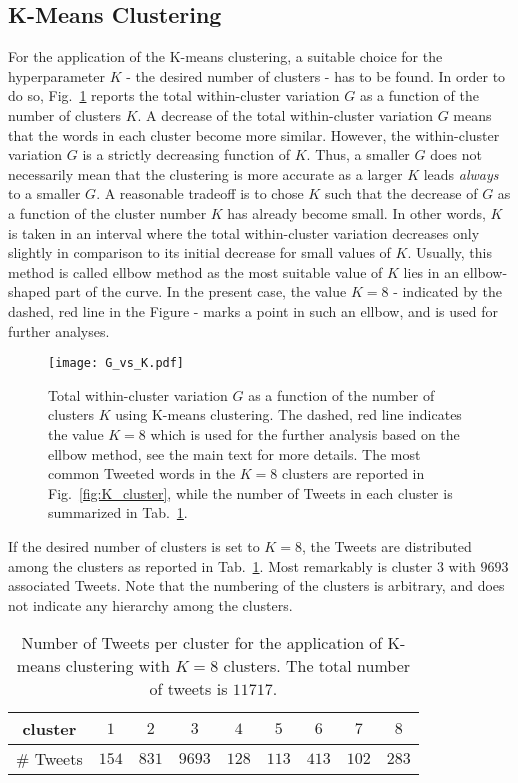 \subsection{K-Means Clustering}

For the application of the K-means clustering, a suitable choice for the hyperparameter $K$ - the desired number of clusters - has to be found. In order to do so, Fig.~\ref{fig:G_vs_K} reports the total within-cluster variation $G$ as a function of the number of clusters $K$. A decrease of the total within-cluster variation $G$ means that the words in each cluster become more similar. However, the within-cluster variation $G$ is a strictly decreasing function of $K$. Thus, a smaller $G$ does not necessarily mean that the clustering is more accurate as a larger $K$ leads \textit{always} to a smaller $G$. A reasonable tradeoff is to chose $K$ such that the decrease of $G$ as a function of the cluster number $K$ has already become small. In other words, $K$ is taken in an interval where the total within-cluster variation decreases only slightly in comparison to its initial decrease for small values of $K$. Usually, this method is called ellbow method as the most suitable value of $K$ lies in an ellbow-shaped part of the curve. In the present case, the value $K=8$ - indicated by the dashed, red line in the Figure - marks a point in such an ellbow, and is used for further analyses.

\begin{figure}[h!]
\centering
\texttt{[image: G\_vs\_K.pdf]}
\caption{Total within-cluster variation $G$ as a function of the number of clusters $K$ using K-means clustering. The dashed, red line indicates the value $K=8$ which is used for the further analysis based on the ellbow method, see the main text for more details. The most common Tweeted words in the $K=8$ clusters are reported in Fig.~\ref{fig:K_cluster}, while the number of Tweets in each cluster is summarized in Tab.~\ref{tab:tweets_per_cluster}.}
\label{fig:G_vs_K}
\end{figure}

If the desired number of clusters is set to $K=8$, the Tweets are distributed among the clusters as reported in Tab.~\ref{tab:tweets_per_cluster}. Most remarkably is cluster $3$ with $9693$ associated Tweets. Note that the numbering of the clusters is arbitrary, and does not indicate any hierarchy among the clusters.

\begin{table}[h!]
\centering
\begin{tabular}{c||c|c|c|c|c|c|c|c} 
cluster & $1$ & $2$ &$3$ &$4$ &$5$ &$6$ &$7$ &$8$ \\
 \hline
\# Tweets & $154$ & $831$ &$9693$ &$128$ &$113$ &$413$ &$102$ &$283$
\end{tabular}
\caption{Number of Tweets per cluster for the application of K-means clustering with $K=8$ clusters. The total number of tweets is $11717$.}
\label{tab:tweets_per_cluster}
\end{table}

